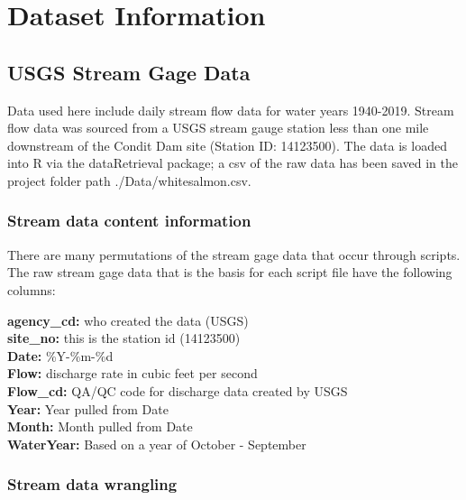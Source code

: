\documentclass[
  12pt,
]{article}
\begin{document}
\newpage

\hypertarget{dataset-information}{%
\section{Dataset Information}\label{dataset-information}}

\hypertarget{usgs-stream-gage-data}{%
\subsection{USGS Stream Gage Data}\label{usgs-stream-gage-data}}

Data used here include daily stream flow data for water years 1940-2019.
Stream flow data was sourced from a USGS stream gauge station less than
one mile downstream of the Condit Dam site (Station ID: 14123500). The
data is loaded into R via the dataRetrieval package; a csv of the raw
data has been saved in the project folder path ./Data/whitesalmon.csv.

\hypertarget{stream-data-content-information}{%
\subsubsection{Stream data content
information}\label{stream-data-content-information}}

There are many permutations of the stream gage data that occur through
scripts. The raw stream gage data that is the basis for each script file
have the following columns:

\textbf{agency\_cd:} who created the data (USGS)\\
\textbf{site\_no:} this is the station id (14123500)\\
\textbf{Date:} \%Y-\%m-\%d\\
\textbf{Flow:} discharge rate in cubic feet per second\\
\textbf{Flow\_cd:} QA/QC code for discharge data created by USGS\\
\textbf{Year:} Year pulled from Date\\
\textbf{Month:} Month pulled from Date\\
\textbf{WaterYear:} Based on a year of October - September

\hypertarget{stream-data-wrangling}{%
\subsubsection{Stream data wrangling}\label{stream-data-wrangling}}
\end{document}
